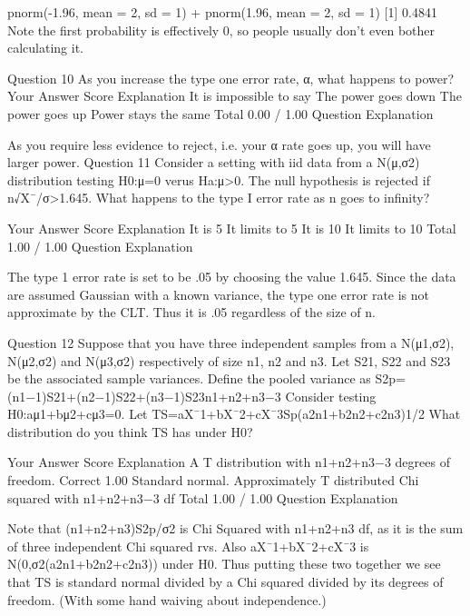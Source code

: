 pnorm(-1.96, mean = 2, sd = 1) + pnorm(1.96, mean = 2, sd = 1)
[1] 0.4841
Note the first probability is effectively 0, so people usually don't even bother calculating it.

Question 10
As you increase the type one error rate, α, what happens to power?
Your Answer                Score        Explanation
It is impossible to say                        
The power goes down                        
The power goes up                        
Power stays the same                        
Total                0.00 / 1.00        
Question Explanation

As you require less evidence to reject, i.e. your α rate goes up, you will have larger power.
Question 11
Consider a setting with iid data from a N(μ,σ2) distribution testing H0:μ=0 verus Ha:μ>0. The null hypothesis is rejected if n√X¯/σ>1.645. What happens to the type I error rate as n goes to infinity?

Your Answer                Score        Explanation
It is 5%
It limits to 5%
It is 10%
It limits to 10%
Total                1.00 / 1.00        
Question Explanation

The type 1 error rate is set to be .05 by choosing the value 1.645. Since the data are assumed Gaussian with a known variance, the type one error rate is not approximate by the CLT. Thus it is .05 regardless of the size of n.

Question 12
Suppose that you have three independent samples from a N(μ1,σ2), N(μ2,σ2) and N(μ3,σ2) respectively of size n1, n2 and n3. Let S21, S22 and S23 be the associated sample variances. Define the pooled variance as
S2p=(n1−1)S21+(n2−1)S22+(n3−1)S23n1+n2+n3−3
Consider testing H0:aμ1+bμ2+cμ3=0. Let
TS=aX¯1+bX¯2+cX¯3Sp(a2n1+b2n2+c2n3)1/2
What distribution do you think TS has under H0?

Your Answer                Score        Explanation
A T distribution with n1+n2+n3−3 degrees of freedom.        Correct        1.00        
Standard normal.                        
Approximately T distributed                        
Chi squared with n1+n2+n3−3 df                        
Total                1.00 / 1.00        
Question Explanation

Note that (n1+n2+n3)S2p/σ2 is Chi Squared with n1+n2+n3 df, as it is the sum of three independent Chi squared rvs. Also aX¯1+bX¯2+cX¯3 is N(0,σ2(a2n1+b2n2+c2n3)) under H0. Thus putting these two together we see that TS is standard normal divided by a Chi squared divided by its degrees of freedom. (With some hand waiving about independence.)

